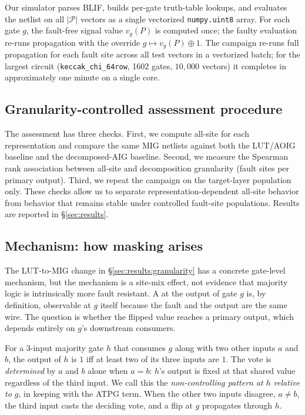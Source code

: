 Our simulator parses BLIF, builds per-gate truth-table lookups, and
evaluates the netlist on all $|\mathcal{P}|$ vectors as a single
vectorized \texttt{numpy.uint8} array. For each gate $g$, the
fault-free signal value $v_g(P)$ is computed once; the faulty
evaluation re-runs propagation with the override
$g \mapsto v_g(P) \oplus 1$. The campaign re-runs full propagation for
each fault site across all test vectors in a vectorized batch; for
the largest circuit (\texttt{keccak\_chi\_64row}, 1602 gates,
$10{,}000$ vectors) it completes in approximately one minute on a
single core.

\subsection{Granularity-controlled assessment procedure}
\label{sec:methodology:procedure}

The assessment has three checks. First, we compute all-site \AvgDP{}
for each representation and compare the same MIG netlists against both
the LUT/AOIG baseline and the decomposed-AIG baseline. Second, we
measure the Spearman rank association between all-site \AvgDP{} and
decomposition granularity (fault sites per primary output). Third, we
repeat the campaign on the target-layer population only. These checks
allow us to separate representation-dependent all-site behavior from
behavior that remains stable under controlled fault-site populations.
Results are reported in \S\ref{sec:results}.

\subsection{Mechanism: how masking arises}
\label{sec:methodology:mechanism}

The LUT-to-MIG \AvgDP{} change in \S\ref{sec:results:granularity}
has a concrete gate-level mechanism, but the mechanism is a site-mix
effect, not evidence that majority logic is intrinsically more
fault resistant. A \bitflip{} at the output of
gate $g$ is, by definition, observable at $g$ itself because the fault
and the output are the same wire. The question is whether the flipped
value reaches a primary output, which depends entirely on $g$'s
downstream consumers.

For a 3-input majority gate $h$ that consumes $g$ along with two
other inputs $a$ and $b$, the output of $h$ is $1$ iff at least two of
its three inputs are $1$. The vote is \emph{determined} by $a$ and
$b$ alone when $a = b$: $h$'s output is fixed at that shared value
regardless of the third input. We call this the \emph{non-controlling
pattern at $h$ relative to $g$}, in keeping with the ATPG term. When
the other two inputs disagree, $a \ne b$, the third input casts the
deciding vote, and a flip at $g$ propagates through $h$.

